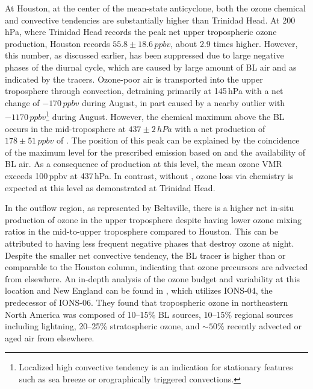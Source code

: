 At Houston, at the center of the mean-state anticyclone, both the ozone chemical and convective tendencies are substantially higher than Trinidad Head.
At 200\,\unit{hPa}, where Trinidad Head records the peak net upper tropospheric ozone production, Houston records $55.8\pm18.6\,\unit{ppbv}$, about
2.9 times higher. However, this number, as discussed earlier, has been suppressed due to large negative phases of the diurnal cycle, which are caused by
large amount of BL air and {\lnox} as indicated by the tracers. Ozone-poor air is transported into the upper troposphere through
convection, detraining primarily at 145\,\unit{hPa} with a net change of $-170\,\unit{ppbv}$  during August, in part
caused by a nearby outlier with $-1170\,\unit{ppbv}$\footnote{Localized high convective tendency is an indication for stationary features such as sea
breeze or orographically triggered convections.} during August. However, the chemical maximum above the BL occurs in the mid-troposphere at
$437\pm2\,\unit{hPa}$ with a net production of $178\pm51\,\unit{ppbv}$ of . The position of this peak can be explained by the coincidence of the maximum
level for the prescribed {\lnox} emission based on \citet{Ott:2010lo} and the availability of BL air. As a consequence of production at this level, the mean
ozone VMR exceeds 100\,\unit{ppbv} at 437\,\unit{hPa}. In contrast, without {\lnox}, ozone loss via chemistry is expected at this level as
demonstrated at Trinidad Head.

In the outflow region, as represented by Beltsville, there is a higher net in-situ production of ozone in the upper troposphere despite having lower
ozone mixing ratios in the mid-to-upper troposphere compared to Houston. This can be attributed to having less frequent negative phases that destroy ozone at night. Despite the smaller net
convective tendency, the BL tracer is higher than or comparable to the Houston column, indicating that ozone precursors are advected from elsewhere. An
in-depth analysis of the ozone budget and variability at this location and New England can be found in \citet{Thompson:2007gd,Thompson:2007ov}, which 
utilizes IONS-04, the predecessor of IONS-06. They found that tropospheric ozone in northeastern North America was composed of 10--15\% BL sources,
10--15\% regional sources including lightning, 20--25\% stratospheric ozone, and $\sim50\%$ recently advected or aged air from elsewhere.

